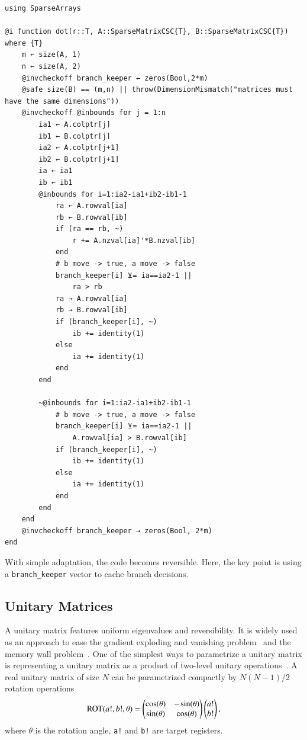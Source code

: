 \documentclass{article}
\newcommand{\<}{\langle}
\renewcommand{\>}{\rangle}
\theoremstyle{definition}\newtheorem{definition}{\textit{Definition}}
\begin{document}
\begin{minipage}{\columnwidth}
\begin{lstlisting}[multicols=2]
using SparseArrays

@i function dot(r::T, A::SparseMatrixCSC{T}, B::SparseMatrixCSC{T}) where {T}
    m ← size(A, 1)
    n ← size(A, 2)
    @invcheckoff branch_keeper ← zeros(Bool,2*m)
    @safe size(B) == (m,n) || throw(DimensionMismatch("matrices must have the same dimensions"))
    @invcheckoff @inbounds for j = 1:n
        ia1 ← A.colptr[j]
        ib1 ← B.colptr[j]
        ia2 ← A.colptr[j+1]
        ib2 ← B.colptr[j+1]
        ia ← ia1
        ib ← ib1
        @inbounds for i=1:ia2-ia1+ib2-ib1-1
            ra ← A.rowval[ia]
            rb ← B.rowval[ib]
            if (ra == rb, ~)
                r += A.nzval[ia]'*B.nzval[ib]
            end
            # b move -> true, a move -> false
            branch_keeper[i] ⊻= ia==ia2-1 ||
                ra > rb
            ra → A.rowval[ia]
            rb → B.rowval[ib]
            if (branch_keeper[i], ~)
                ib += identity(1)
            else
                ia += identity(1)
            end
        end

        ~@inbounds for i=1:ia2-ia1+ib2-ib1-1
            # b move -> true, a move -> false
            branch_keeper[i] ⊻= ia==ia2-1 ||
                A.rowval[ia] > B.rowval[ib]
            if (branch_keeper[i], ~)
                ib += identity(1)
            else
                ia += identity(1)
            end
        end
    end
    @invcheckoff branch_keeper → zeros(Bool, 2*m)
end
\end{lstlisting}
\end{minipage}

With simple adaptation, the code becomes reversible.
Here, the key point is using a \texttt{branch\_keeper} vector to cache branch decisions.

\subsection{Unitary Matrices}\label{sec:umm}
A unitary matrix features uniform eigenvalues and reversibility. It is widely used as an approach to ease the gradient exploding and vanishing problem~\cite{Arjovsky2015,Wisdom2016,Li2016} and the memory wall problem~\cite{Luo2019}.
One of the simplest ways to parametrize a unitary matrix is representing a unitary matrix as a product of two-level unitary operations~\cite{Li2016}. A real unitary matrix of size $N$ can be parametrized compactly by $N(N-1)/2$ rotation operations~\cite{Li2013}
\begin{align}
    {\rm ROT}(a!, b!, \theta)  = \left(\begin{matrix}
        \cos(\theta) & - \sin(\theta)\\
        \sin(\theta)  & \cos(\theta)
    \end{matrix}\right)
    \left(\begin{matrix}
        a!\\
        b!
    \end{matrix}\right),
\end{align}
where \texttt{$\theta$} is the rotation angle, \texttt{a!} and \texttt{b!} are target registers.
\end{document}
